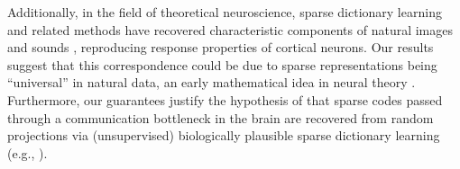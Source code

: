 \documentclass[9pt,twocolumn]{pnas-new}
\begin{document}
Additionally, in the field of theoretical neuroscience, sparse dictionary learning and related methods have recovered characteristic components of natural images \cite{Olshausen96, hurri1996image, bell1997independent, van1998independent} and sounds \cite{bellsejnowski1996, smithlewicki2006, Carlson12}, reproducing response properties of cortical neurons. Our results suggest that this correspondence could be due to  sparse representations being ``universal'' in natural data, an early mathematical idea in neural theory \cite{pitts1947}. Furthermore, our guarantees justify the hypothesis of \cite{Coulter10, Isely10} that sparse codes passed through a communication bottleneck in the brain are recovered from random projections via (unsupervised) biologically plausible sparse dictionary learning (e.g., \cite{rehnsommer2007, rozell2007neurally, hu2014hebbian}).  








\showacknow %

\end{document}

